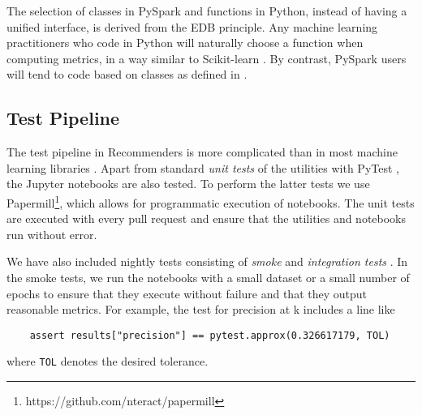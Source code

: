 The selection of classes in PySpark and functions in Python, instead of having a unified
interface, is derived from the EDB principle. Any machine learning practitioners
who code in Python will naturally choose a function when computing metrics, 
in a way similar to Scikit-learn \cite{pedregosa2011scikit}. By contrast, PySpark users 
will tend to code based on classes as defined in \cite{meng2016mllib}. 

\subsection{Test Pipeline}

The test pipeline in Recommenders is more complicated than in most machine learning
libraries \cite{abadi2016tensorflow,paszke2017automatic,pedregosa2011scikit,ke2017lightgbm}.
Apart from standard {\em unit tests} of the utilities with PyTest \cite{krekel2004pytest}, 
the Jupyter notebooks are also tested. To perform the latter tests we use Papermill\footnote{https://github.com/nteract/papermill}, 
which allows for programmatic execution of notebooks. The
unit tests are executed with every pull request and ensure that the utilities and 
notebooks run without error.

We have also included nightly tests consisting of {\em smoke} and {\em integration tests}
\cite{gonzalez-fierro2018beginners}. In the smoke tests, we run the notebooks with a 
small dataset or a small number of epochs to ensure that they execute without failure and that they 
output reasonable metrics. 
For example, the test for precision at k includes a line like
\begin{verbatim}
    assert results["precision"] == pytest.approx(0.326617179, TOL)
\end{verbatim}
where \verb!TOL! denotes the desired tolerance.
%

